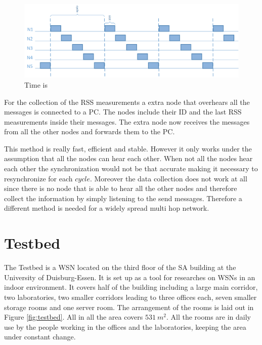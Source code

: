 \begin{figure}[htbp]
	\centering
    \includegraphics[scale=0.8]{content/images/Multispin}
   	\caption{Time is  \cite{RtiMulti}}
    \label{fig:multi}
\end{figure}

For the collection of the RSS measurements a extra node that overhears all the messages is connected to a PC. The nodes include their ID and the last RSS measurements inside their messages. The extra node now receives the messages from all the other nodes and forwards them to the PC.  \cite{RtiMulti}

This method is really fast, efficient and stable. However it only works under the assumption that all the nodes can hear each other. When not all the nodes hear each other the synchronization would not be that accurate making it necessary to resynchronize for each $cycle$. Moreover the data collection does not work at all since there is no node that is able to hear all the other nodes and therefore collect the information by simply listening to the send messages.
Therefore a different method is needed for a widely spread multi hop network.

 
\section{Testbed}
The Testbed is a WSN located on the third floor of the SA building at the University of Duisburg-Essen. It is set up as a tool for researches on WSNs in an indoor environment. It covers half of the building including a large main corridor, two laboratories, two smaller corridors leading to three offices each, seven smaller storage rooms and one server room. The arrangement of the rooms is laid out in Figure \ref{fig:testbed}. All in all the area covers $531\ m^2$. All the rooms are in daily use by the people working in the offices and the laboratories, keeping the area under constant change.

